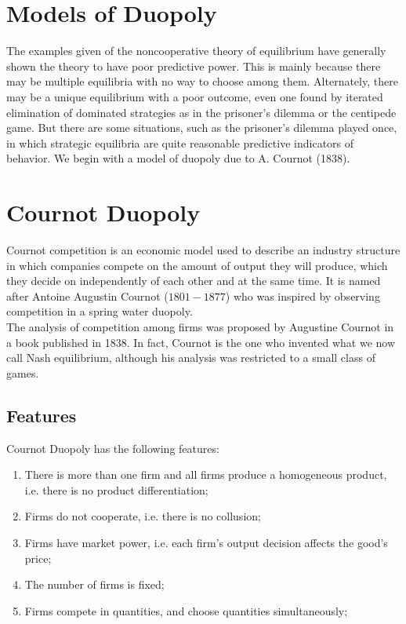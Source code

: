 \documentclass[]{article}
\begin{document}
 

\section{Models of Duopoly}
The examples given of the noncooperative theory of equilibrium have generally shown
the theory to have poor predictive power. This is mainly because there may be multiple
equilibria with no way to choose among them. Alternately, there may be a unique equilibrium
with a poor outcome, even one found by iterated elimination of dominated strategies
as in the prisoner’s dilemma or the centipede game. But there are some situations, such
as the prisoner’s dilemma played once, in which strategic equilibria are quite reasonable
predictive indicators of behavior. We begin with a model of duopoly due to A. Cournot
(1838).

\section*{Cournot Duopoly}

Cournot competition is an economic model used to describe an industry structure in which companies compete on the amount of output they will produce, which they decide on independently of each other and at the same time. It is named after Antoine Augustin Cournot ($1801-1877$) who was inspired by observing competition in a spring water duopoly.
\\ \smallskip
The analysis of competition
among firms was proposed by Augustine Cournot in a book published in 1838. In fact,
Cournot is the one who invented what we now call Nash equilibrium, although his
analysis was restricted to a small class of games.

\subsection*{Features}
Cournot Duopoly has the following features:

\begin{enumerate}
\item There is more than one firm and all firms produce a homogeneous product, i.e. there is no product differentiation;
\item Firms do not cooperate, i.e. there is no collusion;
\item Firms have market power, i.e. each firm's output decision affects the good's price;
\item The number of firms is fixed;
\item Firms compete in quantities, and choose quantities simultaneously;
\end{enumerate}
\end{document}
